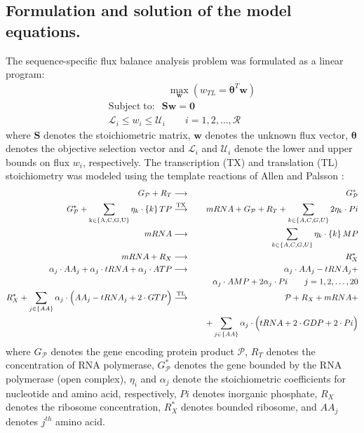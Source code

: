 \documentclass[journal=asbcd6,manuscript=article]{achemso}
\begin{document}
\subsection*{Formulation and solution of the model equations.}
The sequence-specific flux balance analysis problem was formulated as a linear program:
\begin{equation}
 \begin{multlined}
	\qquad \qquad \qquad \max_{\boldsymbol{w}}{} \! \left( w_{TL} = \mathbf{\boldsymbol{\theta}}^T \boldsymbol{w} \right) \\
	\mathrm{Subject \; to:}
	 \; \; \mathbf{S}\mathbf{w}=\mathbf{0} \\
\mathcal{L}_{i} \leq w_i \leq \mathcal{U}_{i}  \qquad i=1,2,\hdots,\mathcal{R}
 \end{multlined}
\end{equation}
where $\mathbf{S}$ denotes the stoichiometric matrix, $\mathbf{w}$ denotes the unknown flux vector, $\boldsymbol{\theta}$ denotes the objective selection vector
and $\mathcal{L}_{i}$ and $\mathcal{U}_{i}$ denote the lower and upper bounds on flux $w_{i}$, respectively.
The transcription (TX) and translation (TL) stoichiometry was modeled using the template reactions of Allen and Palsson \cite{Allen:2003aa}:
\begin{eqnarray*}
{G}_{\mathcal{P}}+{R}_{T} &\longrightarrow& G_{\mathcal{P}}^{*} \\
G_{\mathcal{P}}^{*}+\sum_{\mathrm{k\in\left\{A,C,G,U\right\}}}\eta_{k}\cdot \left\{k\right\}TP &\overset{\rm TX}{\longrightarrow}& mRNA+G_{\mathcal{P}}+R_{T}+ \sum_{k\in\left\{A,C,G,U\right\}}2 \eta_{k} \cdot Pi\\
mRNA &\longrightarrow& \sum_{k\in\left\{A,C,G,U\right\}}\eta_{k}\cdot \left\{k\right\}MP \\
mRNA+R_{X} &\longrightarrow& R_{X}^{*} \\
\alpha_{j}\cdot AA_{j}+\alpha_{j}\cdot tRNA+\alpha_{j}\cdot ATP &\longrightarrow& \alpha_{j}\cdot AA_{j}-tRNA_{j}+\\
&& \qquad \alpha_{j}\cdot AMP+2\alpha_{j}\cdot Pi \qquad{j=1,2,\hdots,20}\\
R_{X}^{*}+\sum_{j\in\left\{AA\right\}}\alpha_{j}\cdot \Big(AA_{j}-tRNA_{j}+2\cdot GTP\Big) &\stackrel{\rm TL}{\longrightarrow}& \mathcal{P}+R_{X}+mRNA+\\
&& \quad +\sum_{j\in\left\{AA\right\}}\alpha_{j}\cdot\Big(tRNA+2\cdot GDP+2\cdot Pi\Big)
\end{eqnarray*}
where $G_{\mathcal{P}}$ denotes the gene encoding protein product $\mathcal{P}$,
$R_{T}$ denotes the concentration of RNA polymerase,
$G_{\mathcal{P}}^{*}$ denotes the gene bounded by the RNA polymerase (open complex),
$\eta_{i}$ and $ \alpha_{j}$ denote the stoichiometric coefficients for nucleotide and amino acid, respectively,
$Pi$ denotes inorganic phosphate,
$R_{X}$ denotes the ribosome concentration,
$R_{X}^{*}$ denotes bounded ribosome,
and $AA_{j}$ denotes $j^{th}$ amino acid.
\end{document}
